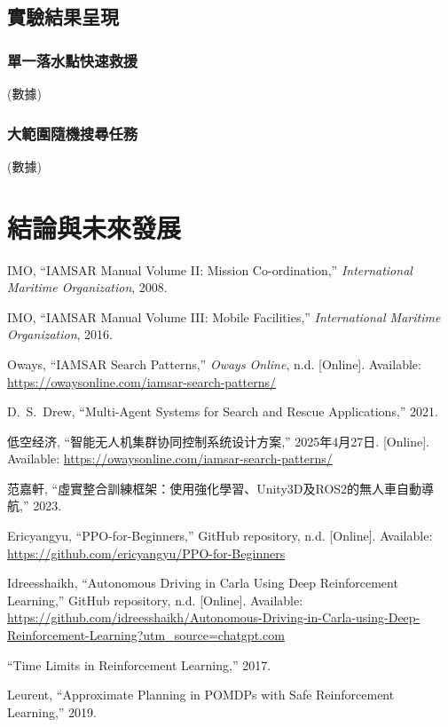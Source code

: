 \documentclass[12pt,a4paper]{ctexart}
\begin{document}
\subsection{實驗結果呈現}
\subsubsection{單一落水點快速救援}
(數據)

\subsubsection{大範圍隨機搜尋任務}
(數據)



\section{結論與未來發展}

\begin{thebibliography}{9}

IMO,
``IAMSAR Manual Volume II: Mission Co-ordination,''
\textit{International Maritime Organization},
2008.

IMO,
``IAMSAR Manual Volume III: Mobile Facilities,''
\textit{International Maritime Organization},
2016.

Oways,
``IAMSAR Search Patterns,''
\textit{Oways Online},
n.d.
[Online]. Available: \url{https://owaysonline.com/iamsar-search-patterns/}

D.~S.~Drew,
``Multi-Agent Systems for Search and Rescue Applications,''
2021.

低空经济,
``智能无人机集群协同控制系统设计方案,''
2025年4月27日.
[Online]. Available: \url{https://owaysonline.com/iamsar-search-patterns/}

范嘉軒,
``虛實整合訓練框架：使用強化學習、Unity3D及ROS2的無人車自動導航,''
2023.

Ericyangyu,
``PPO-for-Beginners,''
GitHub repository,
n.d.
[Online]. Available: \url{https://github.com/ericyangyu/PPO-for-Beginners}


Idreesshaikh,
``Autonomous Driving in Carla Using Deep Reinforcement Learning,''
GitHub repository,
n.d.
[Online]. Available: \url{https://github.com/idreesshaikh/Autonomous-Driving-in-Carla-using-Deep-Reinforcement-Learning?utm\_source=chatgpt.com}


``Time Limits in Reinforcement Learning,''
2017.

Leurent,
``Approximate Planning in POMDPs with Safe Reinforcement Learning,''
2019.

\end{thebibliography}
\end{document}
